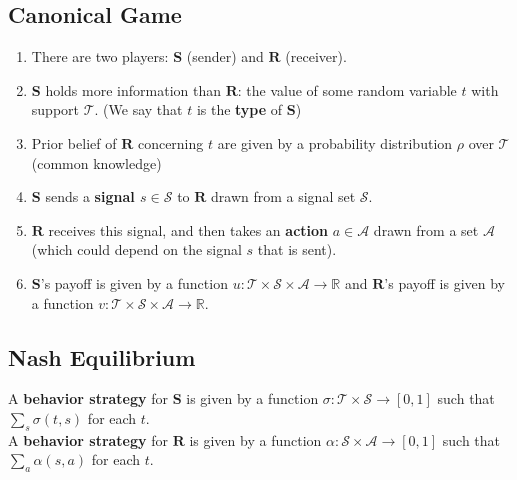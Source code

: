 \documentclass[11pt]{elegantbook_2}
\begin{document}
\subsection{Canonical Game}
\begin{definition}
    \begin{enumerate}
        \item There are two players: $\mathbf{S}$ (sender) and $\mathbf{R}$ (receiver).
        \item $\mathbf{S}$ holds more information than $\mathbf{R}$: the value of some random variable $t$ with support $\mathcal{T}$. (We say that $t$ is the \textbf{type} of $\mathbf{S}$)
        \item Prior belief of $\mathbf{R}$ concerning $t$ are given by a probability distribution $\rho$ over $\mathcal{T}$ (common knowledge)
        \item $\mathbf{S}$ sends a \textbf{signal $s\in \mathcal{S}$} to $\mathbf{R}$ drawn from a signal set $\mathcal{S}$.
        \item $\mathbf{R}$ receives this signal, and then takes an \textbf{action} $a\in \mathcal{A}$ drawn from a set $\mathcal{A}$ (which could depend on the signal $s$ that is sent).
        \item $\mathbf{S}$'s payoff is given by a function $u: \mathcal{T}\times \mathcal{S} \times \mathcal{A} \rightarrow \mathbb{R}$ and $\mathbf{R}$'s payoff is given by a function $v: \mathcal{T}\times \mathcal{S} \times \mathcal{A} \rightarrow \mathbb{R}$.
    \end{enumerate}
\end{definition}

\subsection{Nash Equilibrium}
\begin{definition}[Strategy]
    A \textbf{behavior strategy} for $\mathbf{S}$ is given by a function $\sigma: \mathcal{T}\times\mathcal{S} \rightarrow [0,1]$ such that $\sum_s \sigma(t,s)$ for each $t$.\\
    A \textbf{behavior strategy} for $\mathbf{R}$ is given by a function $\alpha: \mathcal{S}\times\mathcal{A} \rightarrow [0,1]$ such that $\sum_a \alpha(s,a)$ for each $t$.
\end{definition}
\end{document}
